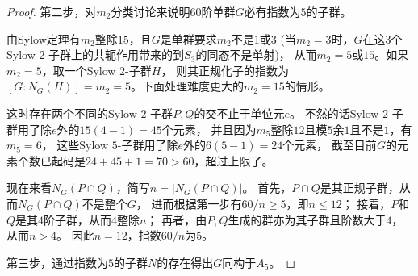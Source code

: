 \begin{enumerate}
\begin{proof}
    第二步，对$m_2$分类讨论来说明$60$阶单群$G$必有指数为$5$的子群。

    由Sylow定理有$m_2$整除$15$，且$G$是单群要求$m_2$不是$1$或$3$ 
    (当$m_2=3$时，$G$在这$3$个Sylow $2$-子群上的共轭作用带来的到$S_3$的同态不是单射)，
    从而$m_2=5$或$15$。如果$m_2=5$，取一个Sylow $2$-子群$H$，
    则其正规化子的指数为$[G:N_G(H)]=m_2=5$。下面处理难度更大的$m_2=15$的情形。

    这时存在两个不同的Sylow $2$-子群$P,Q$的交不止于单位元$e$。
    不然的话Sylow $2$-子群用了除$e$外的$15(4-1)=45$个元素，
    并且因为$m_5$整除$12$且模$5$余$1$且不是$1$，有$m_5=6$，
    这些Sylow $5$-子群用了除$e$外的$6(5-1)=24$个元素，
    截至目前$G$的元素个数已起码是$24+45+1=70>60$，超过上限了。

    现在来看$N_G(P \cap Q)$，简写$n=|N_G(P \cap Q)|$。
    首先，$P \cap Q$是其正规子群，从而$N_G(P \cap Q)$不是整个$G$，
    进而根据第一步有$60/n\geqslant5$，即$n\leqslant12$；
    接着，$P$和$Q$是其$4$阶子群，从而$4$整除$n$；
    再者，由$P,Q$生成的群亦为其子群且阶数大于$4$，从而$n>4$。
    因此$n=12$，指数$60/n$为$5$。

    第三步，通过指数为$5$的子群$N$的存在得出$G$同构于$A_5$。


\end{proof}
\end{enumerate}
